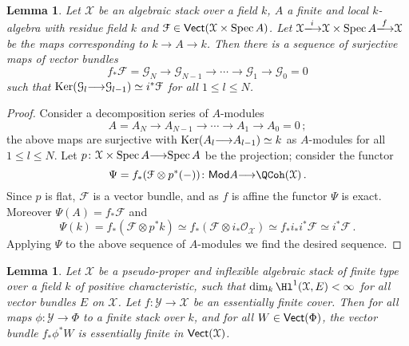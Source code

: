 \documentclass[12pt,reqno]{amsart}
\theoremstyle{plain}
\newtheorem{lem}[thm]{Lemma}
\theoremstyle{definition}
\numberwithin{thm}{section}
\newcounter{x}\setcounter{x}{1}
\theoremstyle{plain}
\begin{document}
\begin{lem}\label{decomposition series lemma}
Let ${\mathcal{X}}$ be an algebraic stack over a field $k$, $A$ a finite and local $k$-algebra with residue
field $k$ and ${\mathcal{F}}\in {\text{\sf Vect}}({\mathcal{X}}\times {{\rm Spec \,}} A)$. Let ${\mathcal{X}}{\xlongrightarrow{i}} {\mathcal{X}}\times {{\rm Spec \,}} A {\xlongrightarrow{f}}
{\mathcal{X}}$ be the maps corresponding to $k{\longrightarrow} A{\longrightarrow} k$. Then there is a sequence of surjective maps of
vector bundles
 \[
 f_*{\mathcal{F}}={\mathcal{G}}_N {\longrightarrow} {\mathcal{G}}_{N-1} {\longrightarrow} \cdots {\longrightarrow} {\mathcal{G}}_1 {\longrightarrow} {\mathcal{G}}_0=0
\]
such that ${{\rm Ker}}({\mathcal{G}}_l {\longrightarrow} {\mathcal{G}}_{l-1})\simeq i^*{\mathcal{F}}$ for all $1\leq l \leq N$.
\end{lem}
\begin{proof}
 Consider a decomposition series of $A$-modules
\[
A=A_N {\longrightarrow} A_{N-1} {\longrightarrow} \cdots {\longrightarrow} A_1 {\longrightarrow} A_0=0\, ;
\]
the above maps are surjective with ${{\rm Ker}}(A_l {\longrightarrow} A_{l-1})\simeq k$ as $A$-modules for all $1\leq l \leq N$. Let $p\colon {\mathcal{X}}\times {{\rm Spec \,}} A{\longrightarrow} {{\rm Spec \,}} A$ be the projection; consider the functor 
$$
\Psi=f_*({\mathcal{F}}\otimes p^*(-)) \colon {\text{\sf Mod}} A {\longrightarrow} \QCoh({\mathcal{X}})\, .
$$
Since $p$ is flat, ${\mathcal{F}}$ is a vector bundle, and as $f$ is affine the functor $\Psi$ is exact. Moreover $\Psi(A)=f_*{\mathcal{F}}$ and
\[
\Psi(k)=f_*({\mathcal{F}}\otimes p^*k) \simeq f_*({\mathcal{F}}\otimes i_*{\mathcal{O}_{\mathcal{X}}})\simeq f_*i_*i^*{\mathcal{F}} \simeq i^*{\mathcal{F}}\, .
\]
Applying $\Psi$ to the above sequence of $A$-modules we find the desired sequence.
\end{proof}

\begin{lem}\label{push of ess finite is still ess finite}
 Let ${\mathcal{X}}$ be a pseudo-proper and inflexible algebraic stack of finite type over a
field $k$ of positive characteristic, such that $\dim_k \Hl^1({\mathcal{X}},E)<\infty$ for all
vector bundles $E$ on ${\mathcal{X}}$. Let $f\colon {\mathcal{Y}}{\longrightarrow} {\mathcal{X}}$ be an essentially finite
cover. Then for all maps $\phi\colon {\mathcal{Y}}{\longrightarrow} \Phi$ to a finite stack over $k$, and
for all $W\in {\text{\sf Vect}}(\Phi)$, the vector bundle $f_*\phi^*W$ is essentially finite
in ${\text{\sf Vect}}({\mathcal{X}})$.
\end{lem}
\end{document}
